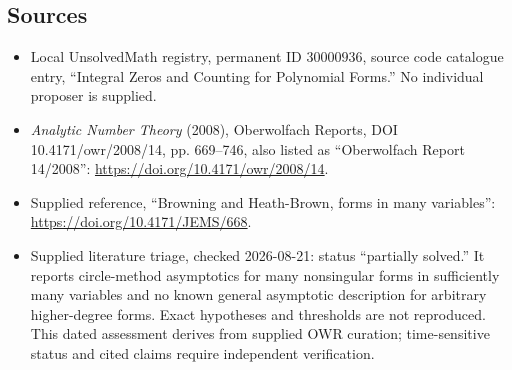 \documentclass[11pt]{article}
\begin{document}
\subsection{Sources}
\begin{itemize}
\item Local UnsolvedMath registry, permanent ID \(30000936\), source code catalogue entry, ``Integral Zeros and Counting for Polynomial Forms.'' No individual proposer is supplied.
\item \emph{Analytic Number Theory} (2008), Oberwolfach Reports, DOI 10.4171/owr/2008/14, pp. 669--746, also listed as ``Oberwolfach Report 14/2008'': \url{https://doi.org/10.4171/owr/2008/14}.
\item Supplied reference, ``Browning and Heath-Brown, forms in many variables'': \url{https://doi.org/10.4171/JEMS/668}.
\item Supplied literature triage, checked 2026-08-21: status ``partially solved.'' It reports circle-method asymptotics for many nonsingular forms in sufficiently many variables and no known general asymptotic description for arbitrary higher-degree forms. Exact hypotheses and thresholds are not reproduced. This dated assessment derives from supplied OWR curation; time-sensitive status and cited claims require independent verification.
\end{itemize}
\end{document}
